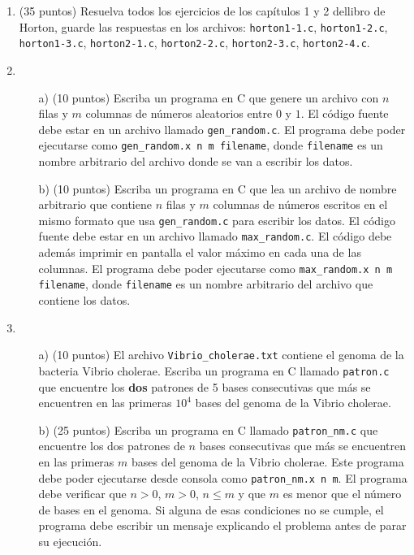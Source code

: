 \documentclass{article}
\begin{document}
\begin{enumerate}

\item (35 puntos) Resuelva todos los ejercicios de los capítulos 1 y 2 dellibro de Horton, guarde las respuestas en los archivos: \verb+horton1-1.c+, \verb+horton1-2.c+, \verb+horton1-3.c+, \verb+horton2-1.c+, \verb+horton2-2.c+, \verb+horton2-3.c+, \verb+horton2-4.c+.

\item
\begin{itemize}
\item[a)] (10 puntos) Escriba un programa en C que genere un archivo
  con $n$ filas y $m$ columnas de n\'umeros aleatorios entre $0$ y
  $1$. El c\'odigo fuente debe estar en un archivo llamado
  \verb"gen_random.c". El programa debe poder ejecutarse como
  \verb"gen_random.x n m filename", donde \verb"filename" es un nombre
  arbitrario del archivo donde se van a escribir los datos. 

\item[b)] (10 puntos) 
Escriba un programa en C que lea un archivo de nombre arbitrario que
contiene $n$ filas y $m$ columnas de n\'umeros escritos en el mismo
formato que usa \verb"gen_random.c" para escribir los datos. El
c\'odigo fuente debe estar en un archivo llamado
\verb"max_random.c". El c\'odigo debe adem\'as imprimir en pantalla el
valor m\'aximo en cada una de las columnas. El programa debe poder
ejecutarse como \verb"max_random.x n m filename", donde
\verb"filename" es un nombre arbitrario del archivo que contiene los
datos. 

\end{itemize}

\item
\begin{itemize}
\item[a)] (10 puntos) El archivo \verb"Vibrio_cholerae.txt" contiene
  el genoma de la bacteria Vibrio cholerae. Escriba un programa en C
  llamado \verb"patron.c" que encuentre los {\bf dos} patrones de 5 bases
  consecutivas que m\'as se encuentren en las primeras $10^4$ bases
  del genoma de la Vibrio cholerae. 

\item[b)] (25 puntos) Escriba un programa en C llamado
  \verb"patron_nm.c" que encuentre los dos patrones de $n$ bases
  consecutivas que m\'as se encuentren en las primeras $m$ bases del
  genoma de la Vibrio cholerae. Este programa debe poder ejecutarse
  desde consola como \verb"patron_nm.x n m". El programa debe
  verificar que $n>0$, $m>0$, $n\leq m$ y que $m$ es menor que el
  n\'umero de bases en el genoma. Si alguna de esas condiciones no se
  cumple, el programa debe escribir un mensaje explicando el problema
  antes de parar su ejecuci\'on. 
\end{itemize}



\end{enumerate}
\end{document}
